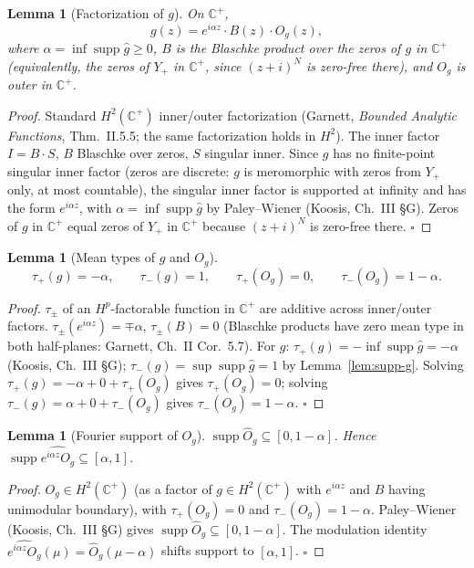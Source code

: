 \documentclass[11pt]{article}
\newtheorem{lemma}[theorem]{Lemma}
\theoremstyle{definition}
\newcommand{\C}{\mathbb{C}}
\newcommand{\Cp}{\C^{+}}
\newcommand{\supp}{\operatorname{supp}}
\begin{document}
\begin{lemma}[Factorization of $g$]\label{lem:gfact}
On $\Cp$,
\[
g(z)=e^{i\alpha z}\cdot B(z)\cdot O_g(z),
\]
where $\alpha=\inf\supp\hat g\ge 0$, $B$ is the Blaschke product over the zeros of $g$ in $\Cp$ (equivalently, the zeros of $Y_+$ in $\Cp$, since $(z+i)^N$ is zero-free there), and $O_g$ is outer in $\Cp$.
\end{lemma}

\begin{proof}
Standard $H^2(\Cp)$ inner/outer factorization (Garnett, \emph{Bounded Analytic Functions}, Thm.~II.5.5; the same factorization holds in $H^2$). The inner factor $I=B\cdot S$, $B$ Blaschke over zeros, $S$ singular inner. Since $g$ has no finite-point singular inner factor (zeros are discrete: $g$ is meromorphic with zeros from $Y_+$ only, at most countable), the singular inner factor is supported at infinity and has the form $e^{i\alpha z}$, with $\alpha=\inf\supp\hat g$ by Paley--Wiener (Koosis, Ch.~III \S G). Zeros of $g$ in $\Cp$ equal zeros of $Y_+$ in $\Cp$ because $(z+i)^N$ is zero-free there. $\square$
\end{proof}

\begin{lemma}[Mean types of $g$ and $O_g$]\label{lem:gmean}
\[
\tau_+(g)=-\alpha,\qquad \tau_-(g)=1,\qquad \tau_+(O_g)=0,\qquad \tau_-(O_g)=1-\alpha.
\]
\end{lemma}

\begin{proof}
$\tau_\pm$ of an $H^p$-factorable function in $\Cp$ are additive across inner/outer factors. $\tau_\pm(e^{i\alpha z})=\mp\alpha$, $\tau_\pm(B)=0$ (Blaschke products have zero mean type in both half-planes: Garnett, Ch.~II Cor.~5.7). For $g$: $\tau_+(g)=-\inf\supp\hat g=-\alpha$ (Koosis, Ch.~III \S G); $\tau_-(g)=\sup\supp\hat g=1$ by Lemma~\ref{lem:supp-g}. Solving $\tau_+(g)=-\alpha+0+\tau_+(O_g)$ gives $\tau_+(O_g)=0$; solving $\tau_-(g)=\alpha+0+\tau_-(O_g)$ gives $\tau_-(O_g)=1-\alpha$. $\square$
\end{proof}

\begin{lemma}[Fourier support of $O_g$]\label{lem:suppOg}
$\supp\hat O_g\subseteq[0,1-\alpha]$. Hence $\supp\widehat{e^{i\alpha z}O_g}\subseteq[\alpha,1]$.
\end{lemma}

\begin{proof}
$O_g\in H^2(\Cp)$ (as a factor of $g\in H^2(\Cp)$ with $e^{i\alpha z}$ and $B$ having unimodular boundary), with $\tau_+(O_g)=0$ and $\tau_-(O_g)=1-\alpha$. Paley--Wiener (Koosis, Ch.~III \S G) gives $\supp\hat O_g\subseteq[0,1-\alpha]$. The modulation identity $\widehat{e^{i\alpha z}O_g}(\mu)=\hat O_g(\mu-\alpha)$ shifts support to $[\alpha,1]$. $\square$
\end{proof}
\end{document}
